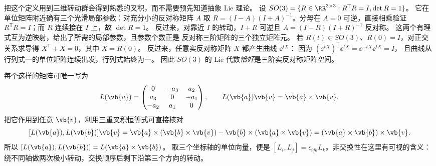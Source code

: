 把这个定义用到三维转动群会得到熟悉的叉积，而不需要预先知道抽象 Lie 理论。
设
\(SO(3)=\{R\in\RR^{3\times3}:R^{\mathsf T}R=I,\det R=1\}\)。
它在单位矩阵附近确有三个光滑局部参数：对充分小的反对称矩阵 \(A\) 取
\(R=(I-A)(I+A)^{-1}\)。分母在 \(A=0\) 可逆，直接相乘验证
\(R^{\mathsf T}R=I\)；而 \(R\) 连续接在 \(I\) 上，故 \(\det R=1\)。
反过来，对靠近 \(I\) 的转动，\(I+R\) 可逆且
\(A=(I-R)(I+R)^{-1}\) 反对称。
这两个有理式互为逆映射，给出了所需的局部参数，且参数个数正是
反对称三阶矩阵的三个独立矩阵元。
若 \(R(t)\in SO(3)\)、\(R(0)=I\)，对正交关系求导得
\(X^{\mathsf T}+X=0\)，其中 \(X=\dot R(0)\)。
反过来，任意实反对称矩阵 \(X\) 都产生曲线 \(\ee^{tX}\)：
因为 \((\ee^{tX})^{\mathsf T}\ee^{tX}=\ee^{-tX}\ee^{tX}=I\)，
且曲线从行列式一的单位矩阵连续出发，行列式始终为一。
因此 \(SO(3)\) 的 Lie 代数\emph{恰好}是三阶实反对称矩阵空间。

每个这样的矩阵可唯一写为
\[
L(\vb{a})=
\begin{pmatrix}
0&-a_3&a_2\\ a_3&0&-a_1\\ -a_2&a_1&0
\end{pmatrix},\qquad
L(\vb{a})\vb{v}=\vb{a}\times\vb{v}.
\]
把它作用到任意 \(\vb{v}\)，利用三重叉积恒等式可直接核对
\[
[L(\vb{a}),L(\vb{b})]\vb{v}
=\vb{a}\times(\vb{b}\times\vb{v})
-\vb{b}\times(\vb{a}\times\vb{v})
=(\vb{a}\times\vb{b})\times\vb{v}.
\]
所以 \([L(\vb{a}),L(\vb{b})]=L(\vb{a}\times\vb{b})\)。
取三个坐标轴的单位向量，便是
\([L_i,L_j]=\epsilon_{ijk}L_k\)。非交换性在这里有可视的含义：
绕不同轴做两次极小转动，交换顺序后剩下沿第三个方向的转动。




